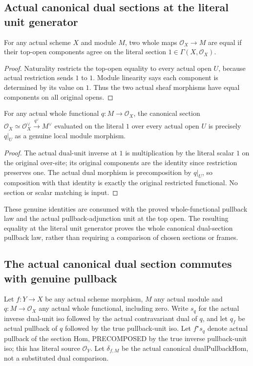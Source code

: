 \subsection{Actual canonical dual sections at the literal unit generator}
\begin{lemma}
\label{lem:seven-unit-hom-ext-top}
\leanok
For any actual scheme $X$ and module $M$, two whole maps
$\mathcal O_X\to M$ are equal if their top-open components agree on the
literal section $1\in\Gamma(X,\mathcal O_X)$.
\end{lemma}
\begin{proof}
Naturality restricts the top-open equality to every actual open $U$,
because actual restriction sends $1$ to $1$. Module linearity says each
component is determined by its value on $1$. Thus the two actual sheaf
morphisms have equal components on all original opens.
\end{proof}
\begin{lemma}
\label{lem:seven-canonical-dual-section-evaluation}
\leanok
For any actual whole functional $q:M\to\mathcal O_X$, the canonical
section $\mathcal O_X\simeq\mathcal O_X^\vee\xrightarrow{q^\vee}M^\vee$
evaluated on the literal $1$ over every actual open $U$ is precisely
$q|_U$ as a genuine local module morphism.
\end{lemma}
\begin{proof}
The actual dual-unit inverse at $1$ is multiplication by the literal
scalar $1$ on the original over-site; its original components are the
identity since restriction preserves one. The actual dual morphism is
precomposition by $q|_U$, so composition with that identity is exactly
the original restricted functional. No section or scalar matching is input.
\end{proof}
These genuine identities are consumed with the proved whole-functional
pullback law and the actual pullback-adjunction unit at the top open.
The resulting equality at the literal unit generator proves the whole
canonical dual-section pullback law, rather than requiring a comparison
of chosen sections or frames.

\subsection{The actual canonical dual section commutes with genuine pullback}
Let $f:Y\to X$ be any actual scheme morphism, $M$ any actual module and
$q:M\to\mathcal O_X$ any actual whole functional, including zero.
Write $s_q$ for the actual inverse dual-unit iso followed by the actual
contravariant dual of $q$, and let $q_f$ be actual pullback of $q$
followed by the true pullback-unit iso. Let $f^\star s_q$ denote actual
pullback of the section Hom, PRECOMPOSED by the true inverse pullback-unit
iso; this has literal source $\mathcal O_Y$. Let $\delta_{f,M}$ be the
actual canonical dualPullbackHom, not a substituted dual comparison.

